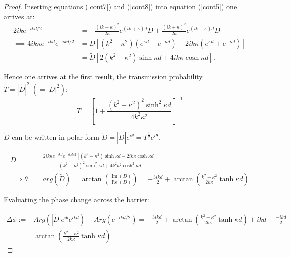 \documentclass{article}
\begin{document}
\begin{proof}
\noindent Inserting equations (\ref{cont7}) and (\ref{cont8}) into equation (\ref{cont5}) one arrives at:
\begin{subequations}
\begin{align}
	2ike^{-ikd/2} &= -\frac{(ik-\kappa)^2}{2\kappa}e^{(ik+\kappa)d}\tilde{D}+\frac{(ik+\kappa)^2}{2\kappa}e^{(ik-\kappa)d}\tilde{D} \label{cont9} \\
	\implies 4ik\kappa e^{-ikd}e^{-ikd/2} &= \tilde{D}[(k^2-\kappa^2)(e^{\kappa d}-e^{-\kappa d})+2ik\kappa(e^{\kappa d}+e^{-\kappa d})] \label{cont10}\\
						      &= \tilde{D}[2(k^2-\kappa^2)\sinh{\kappa d}+4ik\kappa \cosh{\kappa d}] \label{cont11}.
\end{align}
\end{subequations}

\noindent Hence one arrives at the first result, the transmission probability $T = |\tilde{D}|^2 \;(=|D|^2)$:
\begin{equation}
	T = \left[1+\frac{(k^2+\kappa^2)^2\sinh^2{\kappa d}}{4k^2\kappa^2}\right]^{-1}
	\label{transmissionprobability}
\end{equation}

\noindent $\tilde{D}$ can be written in polar form $\tilde{D} = |\tilde{D}|e^{i\theta} = T^{\frac{1}{2}}e^{i\theta}$.

\begin{subequations}
\begin{align}
	\tilde{D}&=\frac{2ik\kappa e^{-ikd}e^{-ikd/2}\left[(k^2-\kappa^2)\sinh{\kappa d}-2ik\kappa\cosh{\kappa d}\right]}{(k^2-\kappa^2)^2\sinh^2{\kappa d}+4k^2\kappa^2\cosh^2{\kappa d}}\\
		 \implies \theta &= arg(\tilde{D})=\arctan\left(\frac{\operatorname{Im}(D)}{\operatorname{Re}(D)}\right) = -\frac{3ikd}{2}+\arctan\left(\frac{k^2-\kappa^2}{2k\kappa}\tanh{\kappa d}\right)
\end{align}
\end{subequations}

\noindent Evaluating the phase change across the barrier:

\begin{subequations}
\begin{align}
	\Delta\phi :=& Arg(|\tilde{D}|e^{i\theta}e^{ikd})-Arg(e^{-ikd/2})=-\frac{3ikd}{2}+\arctan\left(\frac{k^2-\kappa^2}{2k\kappa}\tanh{\kappa d}\right)+ikd-\frac{-ikd}{2}\\
	=& \arctan\left(\frac{k^2-\kappa^2}{2k\kappa}\tanh{\kappa d}\right) \label{phasechange}
\end{align}
\end{subequations}


\end{proof}
\end{document}
